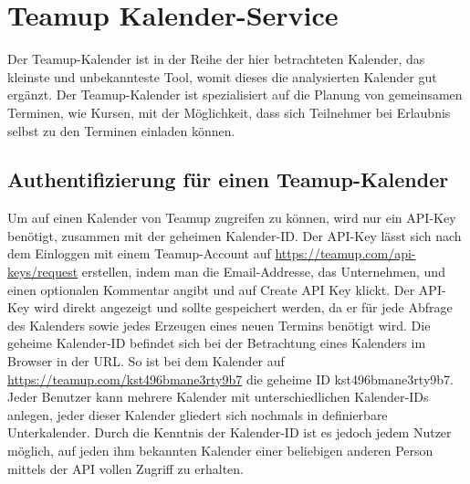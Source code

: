 \section{Teamup Kalender-Service}
Der Teamup-Kalender ist in der Reihe der hier betrachteten Kalender, das kleinste und unbekannteste Tool, womit dieses die analysierten Kalender gut ergänzt. Der Teamup-Kalender ist spezialisiert auf die Planung von gemeinsamen Terminen, wie Kursen, mit der Möglichkeit, dass sich Teilnehmer bei Erlaubnis selbst zu den Terminen einladen können. 

\subsection{Authentifizierung für einen Teamup-Kalender}
Um auf einen Kalender von Teamup zugreifen zu können, wird nur ein API-Key benötigt, zusammen mit der geheimen Kalender-ID. Der API-Key lässt sich nach dem Einloggen mit einem Teamup-Account auf \url{https://teamup.com/api-keys/request} erstellen, indem man die Email-Addresse, das Unternehmen, und einen optionalen Kommentar angibt und auf \glqq Create API Key \glqq klickt. Der API-Key wird direkt angezeigt und sollte gespeichert werden, da er für jede Abfrage des Kalenders sowie jedes Erzeugen eines neuen Termins benötigt wird. Die geheime Kalender-ID befindet sich bei der Betrachtung eines Kalenders im Browser in der URL. So ist bei dem Kalender auf \url{https://teamup.com/kst496bmane3rty9b7} die geheime ID \glqq kst496bmane3rty9b7\grqq{}. Jeder Benutzer kann mehrere Kalender mit unterschiedlichen Kalender-IDs anlegen, jeder dieser Kalender gliedert sich nochmals in definierbare Unterkalender. Durch die Kenntnis der Kalender-ID ist es jedoch jedem Nutzer möglich, auf jeden ihm bekannten Kalender einer beliebigen anderen Person mittels der API vollen Zugriff zu erhalten.

